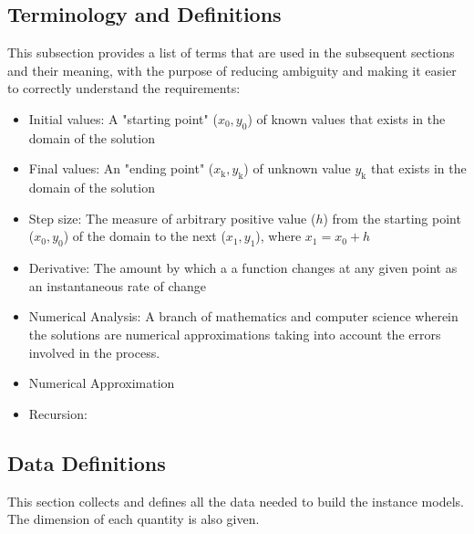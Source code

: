 \documentclass[12pt]{article}
\begin{document}
\subsection{Terminology and  Definitions}

This subsection provides a list of terms that are used in the subsequent
sections and their meaning, with the purpose of reducing ambiguity and making it
easier to correctly understand the requirements:

\begin{itemize}

\item Initial values: A "starting point" ($x_\text{0}, y_\text{0}$) of known values that
exists in the domain of the solution

\item Final values: An "ending point" ($x_\text{k}, y_\text{k}$) of unknown value $y_\text{k}$
that exists in the domain of the solution

\item Step size: The measure of arbitrary positive value ($h$) from the starting point
($x_\text{0}, y_\text{0}$) of the domain to the next ($x_\text{1}, y_\text{1}$), where
$x_\text{1} = x_\text{0} + h$

\item Derivative: The amount by which a a function changes at any given point as an
instantaneous rate of change

\item Numerical Analysis: A branch of mathematics and computer science wherein the solutions
are numerical approximations taking into account the errors involved in the process.

\item Numerical Approximation

\item Recursion:

\end{itemize}

\subsection{Data Definitions} \label{sec_datadef}

This section collects and defines all the data needed to build the instance
models. The dimension of each quantity is also given.  

~\newline
\end{document}
